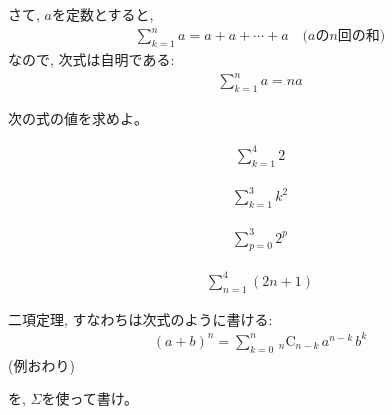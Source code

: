 さて, $a$を定数とすると, 
\begin{eqnarray*}
\sum_{k=1}^n a = a+a+\cdots+a\,\,\,\,\,\,\text{($a$の$n$回の和)}
\end{eqnarray*}
なので, 次式は自明である:
\begin{eqnarray}
\sum_{k=1}^n a = na
\end{eqnarray}

\begin{q}\label{q:alg_series_sum0} 次の式の値を求めよ。
\begin{edaenumerate}
\item \begin{eqnarray*}\sum_{k=1}^4 2\end{eqnarray*}
\item \begin{eqnarray*}\sum_{k=1}^3 k^2\end{eqnarray*}
\item \begin{eqnarray*}\sum_{p=0}^3 2^p\end{eqnarray*}
\item \begin{eqnarray*}\sum_{n=1}^4 (2n+1)\end{eqnarray*}
\end{edaenumerate}
\end{q}\hv

\begin{exmpl} 二項定理, すなわちは次式のように書ける:
\begin{eqnarray}
(a+b)^n=\sum_{k=0}^n \,_n\text{C}_{n-k}\,a^{n-k}\,b^k
\end{eqnarray}
(例おわり)\end{exmpl}

\begin{q}\label{q:sum_binomth2} を, $\Sigma$を使って書け。\end{q}
\hv

